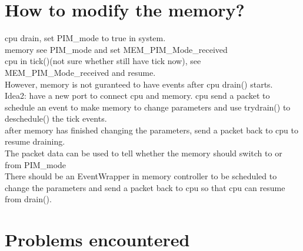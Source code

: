 \documentclass[11pt]{article}
\begin{document}
\section{How to modify the memory?\\}

cpu drain, set PIM\_mode to true in system.\\

memory see PIM\_mode and set MEM\_PIM\_Mode\_received\\
cpu in tick()(not sure whether still have tick now), see MEM\_PIM\_Mode\_received and resume.\\
However, memory is not guranteed to have events after cpu drain() starts.\\

Idea2: have a new port to connect cpu and memory. cpu send a packet to schedule an event to make memory to change parameters and use trydrain() to deschedule() the tick events.\\

after memory has finished changing the parameters, send a packet back to cpu to resume draining.\\ 

The packet data can be used to tell whether the memory should switch to or from PIM\_mode\\

There should be an EventWrapper in memory controller to be scheduled to change the parameters and send a packet back to cpu so that cpu can resume from drain().

\section{Problems encountered\\}
\end{document}

